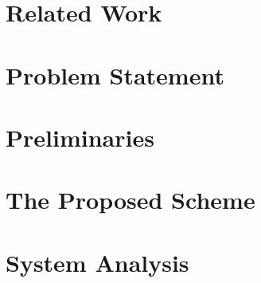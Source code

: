 \documentclass[conference]{IEEEtran}
\begin{document}


\section{Related Work}

\section{Problem Statement}

\section{Preliminaries}

\section{The Proposed Scheme}

\section{System Analysis}




\vspace{12pt}
\end{document}
